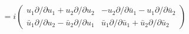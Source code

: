 \begin{equation}
= i \left(
\begin{array}{cc}
u_{1} \partial / \partial u_{1}+ u_{2} \partial / \partial u_{2} & -u_{2} \partial /\partial
\bar{u}_{1}- u_{1} \partial /\partial \bar{u}_{2} \\
\bar{u}_{1} \partial / \partial u_{2}-\bar{u}_{2} \partial / \partial u_{1}  & \bar{u}_{1} \partial
/ \partial \bar{u}_{1}+\bar{u}_{2} \partial / \partial \bar{u}_{2}
\end{array}
\right)
\end{equation}

